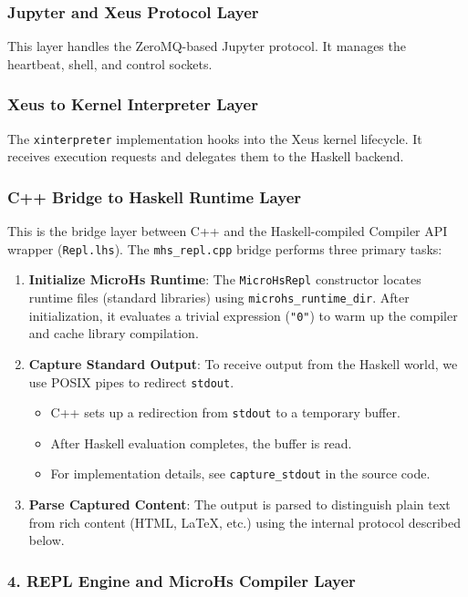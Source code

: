 \documentclass[11pt]{scrartcl}
\begin{document}
\subsubsection{Jupyter and Xeus Protocol Layer}


This layer handles the ZeroMQ-based Jupyter protocol. It manages the heartbeat, shell, and control sockets.
\subsubsection{Xeus to Kernel Interpreter Layer}


The \texttt{xinterpreter} implementation hooks into the Xeus kernel lifecycle. It receives execution requests and delegates them to the Haskell backend.
\subsubsection{C++ Bridge to Haskell Runtime Layer}


This is the bridge layer between C++ and the Haskell-compiled Compiler API wrapper (\texttt{Repl.lhs}).
The \texttt{mhs\_repl.cpp} bridge performs three primary tasks:
\begin{enumerate}
\item \textbf{Initialize MicroHs Runtime}:
   The \texttt{MicroHsRepl} constructor locates runtime files (standard libraries) using \texttt{microhs\_runtime\_dir}. After initialization, it evaluates a trivial expression (\texttt{"0"}) to warm up the compiler and cache library compilation.
\item \textbf{Capture Standard Output}:
   To receive output from the Haskell world, we use POSIX pipes to redirect \texttt{stdout}.
   \begin{itemize}
   \item C++ sets up a redirection from \texttt{stdout} to a temporary buffer.
   \item After Haskell evaluation completes, the buffer is read.
   \item For implementation details, see \texttt{capture\_stdout} in the source code.
   \end{itemize}
\item \textbf{Parse Captured Content}:
   The output is parsed to distinguish plain text from rich content (HTML, LaTeX, etc.) using the internal protocol described below.
\end{enumerate}


\subsubsection{4. REPL Engine and MicroHs Compiler Layer}
\end{document}
